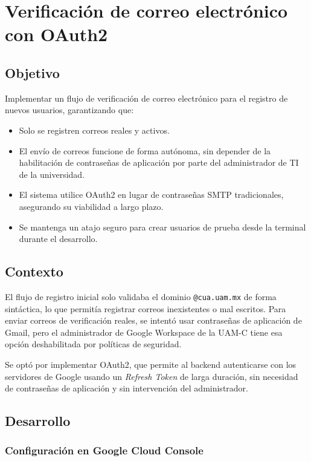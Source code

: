 \chapter{Verificación de correo electrónico con OAuth2}
\label{ch:verificacion_correo}

\section{Objetivo}

Implementar un flujo de verificación de correo electrónico para el registro de nuevos usuarios, garantizando que:

\begin{itemize}[leftmargin=*]
  \item Solo se registren correos reales y activos.
  \item El envío de correos funcione de forma autónoma, sin depender de la habilitación de contraseñas de aplicación por parte del administrador de TI de la universidad.
  \item El sistema utilice OAuth2 en lugar de contraseñas SMTP tradicionales, asegurando su viabilidad a largo plazo.
  \item Se mantenga un atajo seguro para crear usuarios de prueba desde la terminal durante el desarrollo.
\end{itemize}

\section{Contexto}

El flujo de registro inicial solo validaba el dominio \texttt{@cua.uam.mx} de forma sintáctica, lo que permitía registrar correos inexistentes o mal escritos. Para enviar correos de verificación reales, se intentó usar contraseñas de aplicación de Gmail, pero el administrador de Google Workspace de la UAM-C tiene esa opción deshabilitada por políticas de seguridad.

Se optó por implementar OAuth2, que permite al backend autenticarse con los servidores de Google usando un \textit{Refresh Token} de larga duración, sin necesidad de contraseñas de aplicación y sin intervención del administrador.

\section{Desarrollo}

\subsection{Configuración en Google Cloud Console}

